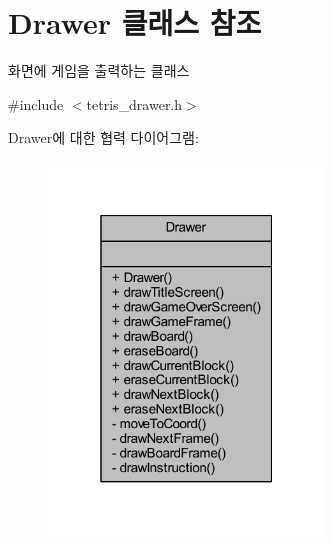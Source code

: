 \hypertarget{class_drawer}{}\section{Drawer 클래스 참조}
\label{class_drawer}


화면에 게임을 출력하는 클래스  




{\ttfamily \#include $<$tetris\+\_\+drawer.\+h$>$}



Drawer에 대한 협력 다이어그램\+:
\nopagebreak
\begin{figure}[H]
\begin{center}
\leavevmode
\includegraphics[width=208pt]{class_drawer__coll__graph}
\end{center}
\end{figure}
